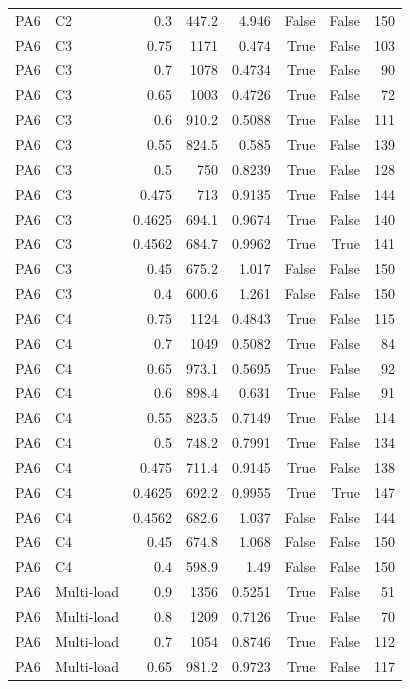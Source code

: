 \begin{table}[htbp]
\begin{tabular}{llrrrrrr}
PA6 & C2 & 0.3 & 447.2 & 4.946 & False & False & 150 \\
PA6 & C3 & 0.75 & 1171 & 0.474 & True & False & 103 \\
PA6 & C3 & 0.7 & 1078 & 0.4734 & True & False & 90 \\
PA6 & C3 & 0.65 & 1003 & 0.4726 & True & False & 72 \\
PA6 & C3 & 0.6 & 910.2 & 0.5088 & True & False & 111 \\
PA6 & C3 & 0.55 & 824.5 & 0.585 & True & False & 139 \\
PA6 & C3 & 0.5 & 750 & 0.8239 & True & False & 128 \\
PA6 & C3 & 0.475 & 713 & 0.9135 & True & False & 144 \\
PA6 & C3 & 0.4625 & 694.1 & 0.9674 & True & False & 140 \\
PA6 & C3 & 0.4562 & 684.7 & 0.9962 & True & True & 141 \\
PA6 & C3 & 0.45 & 675.2 & 1.017 & False & False & 150 \\
PA6 & C3 & 0.4 & 600.6 & 1.261 & False & False & 150 \\
PA6 & C4 & 0.75 & 1124 & 0.4843 & True & False & 115 \\
PA6 & C4 & 0.7 & 1049 & 0.5082 & True & False & 84 \\
PA6 & C4 & 0.65 & 973.1 & 0.5695 & True & False & 92 \\
PA6 & C4 & 0.6 & 898.4 & 0.631 & True & False & 91 \\
PA6 & C4 & 0.55 & 823.5 & 0.7149 & True & False & 114 \\
PA6 & C4 & 0.5 & 748.2 & 0.7991 & True & False & 134 \\
PA6 & C4 & 0.475 & 711.4 & 0.9145 & True & False & 138 \\
PA6 & C4 & 0.4625 & 692.2 & 0.9955 & True & True & 147 \\
PA6 & C4 & 0.4562 & 682.6 & 1.037 & False & False & 144 \\
PA6 & C4 & 0.45 & 674.8 & 1.068 & False & False & 150 \\
PA6 & C4 & 0.4 & 598.9 & 1.49 & False & False & 150 \\
PA6 & Multi-load & 0.9 & 1356 & 0.5251 & True & False & 51 \\
PA6 & Multi-load & 0.8 & 1209 & 0.7126 & True & False & 70 \\
PA6 & Multi-load & 0.7 & 1054 & 0.8746 & True & False & 112 \\
PA6 & Multi-load & 0.65 & 981.2 & 0.9723 & True & False & 117 \\

\end{tabular}
\end{table}
